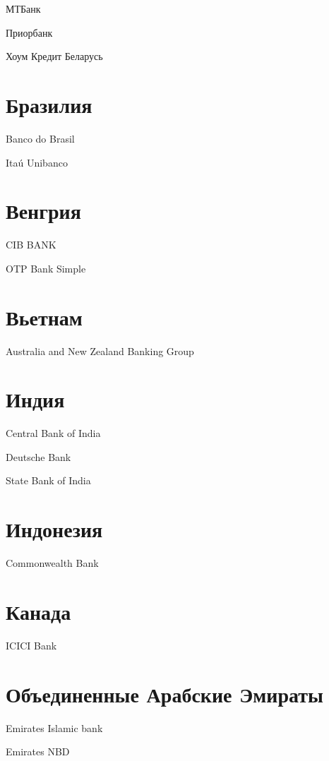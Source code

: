 \documentclass[a4paper,10pt,russian]{sphinxmanual}
\begin{document}
\sphinxAtStartPar
МТБанк

\sphinxAtStartPar
Приорбанк

\sphinxAtStartPar
Хоум Кредит Беларусь


\section{Бразилия}
\label{\detokenize{banks:id3}}
\sphinxAtStartPar
Banco do Brasil

\sphinxAtStartPar
Itaú Unibanco


\section{Венгрия}
\label{\detokenize{banks:id4}}
\sphinxAtStartPar
CIB BANK

\sphinxAtStartPar
OTP Bank \sphinxhyphen{} Simple


\section{Вьетнам}
\label{\detokenize{banks:id5}}
\sphinxAtStartPar
Australia and New Zealand Banking Group


\section{Индия}
\label{\detokenize{banks:id6}}
\sphinxAtStartPar
Central Bank of India

\sphinxAtStartPar
Deutsche Bank

\sphinxAtStartPar
State Bank of India


\section{Индонезия}
\label{\detokenize{banks:id7}}
\sphinxAtStartPar
Commonwealth Bank


\section{Канада}
\label{\detokenize{banks:id8}}
\sphinxAtStartPar
ICICI Bank


\section{Объединенные Арабские Эмираты}
\label{\detokenize{banks:id9}}
\sphinxAtStartPar
Emirates Islamic bank

\sphinxAtStartPar
Emirates NBD
\end{document}
